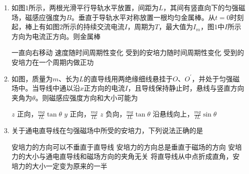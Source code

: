 \begin{enumerate}
\item
{}
如图$ 1 $所示，两根光滑平行导轨水平放置，间距为$ L $，其间有竖直向下的匀强磁场，磁感应强度为$ B $。垂直于导轨水平对称放置一根均匀金属棒。从$ t=0 $时刻起，棒上有如图$ 2 $所示的持续交流电流$ I $，周期为$ T $，最大值为$ I_m $，图$ 1 $中$ I $所示方向为电流正方向。则金属棒
\begin{figure}[h!]
\centering
\begin{subfigure}{0.4\linewidth}
	\centering
	 
	\caption{}\label{}
\end{subfigure}
\begin{subfigure}{0.4\linewidth}
	\centering
	 
	\caption{}\label{}
\end{subfigure}
\end{figure}



\fourchoices
{一直向右移动}
{速度随时间周期性变化}
{受到的安培力随时间周期性变化}
{受到的安培力在一个周期内做正功}





\item
{}
如图，质量为$ m $、长为$ L $的直导线用两绝缘细线悬挂于$ O $、$ O ^{\prime} $，并处于匀强磁场中。当导线中通以沿$ x $正方向的电流$ I $，且导线保持静止时，悬线与竖直方向夹角为$ \theta $。则磁感应强度方向和大小可能为  
\begin{figure}[h!]
	\centering

\end{figure}



\fourchoices
{$ z $ 正向，$\frac { m g } { I L } \tan \theta$}
{$ y $ 正向，$\frac { m g } { I L }$}
{$ z $ 负向，$\frac { m g } { I L } \tan \theta$}
{沿悬线向上，$\frac { m g } { I L } \sin \theta$}







\item
{}
关于通电直导线在匀强磁场中所受的安培力，下列说法正确的是  


\fourchoices
{安培力的方向可以不垂直于直导线}
{安培力的方向总是垂直于磁场的方向}
{安培力的大小与通电直导线和磁场方向的夹角无关}
{将直导线从中点折成直角，安培力的大小一定变为原来的一半}





\end{enumerate}
